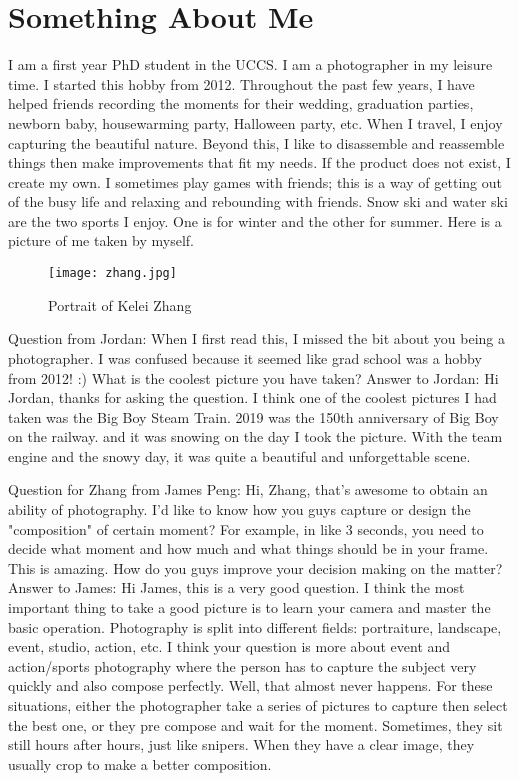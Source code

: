 \section{Something About Me}
I am a first year PhD student in the UCCS. I am a photographer in my leisure time. I started this hobby from 2012. Throughout the past few years, I have helped friends recording the moments for their wedding, graduation parties, newborn baby, housewarming party, Halloween party, etc. When I travel, I enjoy capturing the beautiful nature. Beyond this, I like to disassemble and reassemble things then make improvements that fit my needs. If the product does not exist, I create my own. I sometimes play games with friends; this is a way of getting out of the busy life and relaxing and rebounding with friends. Snow ski and water ski are the two sports I enjoy. One is for winter and the other for summer. Here is a picture of me taken by myself.

\begin{figure}[htbp]
\centerline{\texttt{[image: zhang.jpg]}}
\caption{Portrait of Kelei Zhang}
\label{fig}
\end{figure}

Question from Jordan: When I first read this, I missed the bit about you being a photographer. I was confused because it seemed like grad school was a hobby from 2012! :) What is the coolest picture you have taken?
Answer to Jordan: Hi Jordan, thanks for asking the question. I think one of the coolest pictures I had taken was the Big Boy Steam Train. 2019 was the 150th anniversary of Big Boy on the railway. and it was snowing on the day I took the picture. With the team engine and the snowy day, it was quite a beautiful and unforgettable scene. 

Question for Zhang from James Peng: Hi, Zhang, that's awesome to obtain an ability of photography. I'd like to know how you guys capture or design the "composition" of certain moment? For example, in like 3 seconds, you need to decide what moment and how much and what things should be in your frame. This is amazing. How do you guys improve your decision making on the matter? 
Answer to James: Hi James, this is a very good question. I think the most important thing to take a good picture is to learn your camera and master the basic operation. Photography is split into different fields: portraiture, landscape, event, studio, action, etc. I think your question is more about event and action/sports photography where the person has to capture the subject very quickly and also compose perfectly. Well, that almost never happens. For these situations, either the photographer take a series of pictures to capture then select the best one, or they pre compose and wait for the moment. Sometimes, they sit still hours after hours, just like snipers. When they have a clear image, they usually crop to make a better composition. 
